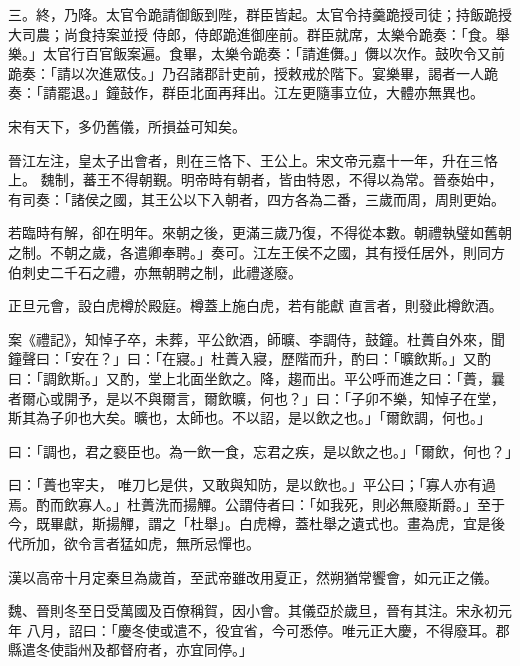 \begin{pinyinscope}
 三。終，乃降。太官令跪請御飯到陛，群臣皆起。太官令持羹跪授司徒；持飯跪授大司農；尚食持案並授
 侍郎，侍郎跪進御座前。群臣就席，太樂令跪奏：「食。舉樂。」太官行百官飯案遍。食畢，太樂令跪奏：「請進儛。」儛以次作。鼓吹令又前跪奏：「請以次進眾伎。」乃召諸郡計吏前，授敕戒於階下。宴樂畢，謁者一人跪奏：「請罷退。」鐘鼓作，群臣北面再拜出。江左更隨事立位，大體亦無異也。



 宋有天下，多仍舊儀，所損益可知矣。



 晉江左注，皇太子出會者，則在三恪下、王公上。宋文帝元嘉十一年，升在三恪上。
 魏制，蕃王不得朝覲。明帝時有朝者，皆由特恩，不得以為常。晉泰始中，有司奏：「諸侯之國，其王公以下入朝者，四方各為二番，三歲而周，周則更始。



 若臨時有解，卻在明年。來朝之後，更滿三歲乃復，不得從本數。朝禮執璧如舊朝之制。不朝之歲，各遣卿奉聘。」奏可。江左王侯不之國，其有授任居外，則同方伯刺史二千石之禮，亦無朝聘之制，此禮遂廢。



 正旦元會，設白虎樽於殿庭。樽蓋上施白虎，若有能獻
 直言者，則發此樽飲酒。



 案《禮記》，知悼子卒，未葬，平公飲酒，師曠、李調侍，鼓鐘。杜蕢自外來，聞鐘聲曰：「安在？」曰：「在寢。」杜蕢入寢，歷階而升，酌曰：「曠飲斯。」又酌曰：「調飲斯。」又酌，堂上北面坐飲之。降，趨而出。平公呼而進之曰：「蕢，曩者爾心或開予，是以不與爾言，爾飲曠，何也？」曰：「子卯不樂，知悼子在堂，斯其為子卯也大矣。曠也，太師也。不以詔，是以飲之也。」「爾飲調，何也。」



 曰：「調也，君之褻臣也。為一飲一食，忘君之疾，是以飲之也。」「爾飲，何也？」



 曰：「蕢也宰夫，
 唯刀匕是供，又敢與知防，是以飲也。」平公曰；「寡人亦有過焉。酌而飲寡人。」杜蕢洗而揚觶。公謂侍者曰：「如我死，則必無廢斯爵。」至于今，既畢獻，斯揚觶，謂之「杜舉」。白虎樽，蓋杜舉之遺式也。畫為虎，宜是後代所加，欲令言者猛如虎，無所忌憚也。



 漢以高帝十月定秦旦為歲首，至武帝雖改用夏正，然朔猶常饗會，如元正之儀。



 魏、晉則冬至日受萬國及百僚稱賀，因小會。其儀亞於歲旦，晉有其注。宋永初元年
 八月，詔曰：「慶冬使或遣不，役宜省，今可悉停。唯元正大慶，不得廢耳。郡縣遣冬使詣州及都督府者，亦宜同停。」




\end{pinyinscope}
